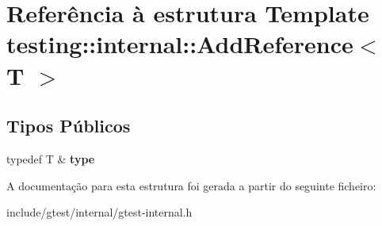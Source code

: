 \hypertarget{structtesting_1_1internal_1_1AddReference}{\section{Referência à estrutura Template testing\-:\-:internal\-:\-:Add\-Reference$<$ T $>$}
\label{structtesting_1_1internal_1_1AddReference}
}
\subsection*{Tipos Públicos}
\begin{DoxyCompactItemize}
\item 
\hypertarget{structtesting_1_1internal_1_1AddReference_a2df8dd7c4e41f6390e6e66b1a9a67bb4}{typedef T \& {\bfseries type}}\label{structtesting_1_1internal_1_1AddReference_a2df8dd7c4e41f6390e6e66b1a9a67bb4}

\end{DoxyCompactItemize}


A documentação para esta estrutura foi gerada a partir do seguinte ficheiro\-:\begin{DoxyCompactItemize}
\item 
include/gtest/internal/gtest-\/internal.\-h\end{DoxyCompactItemize}

